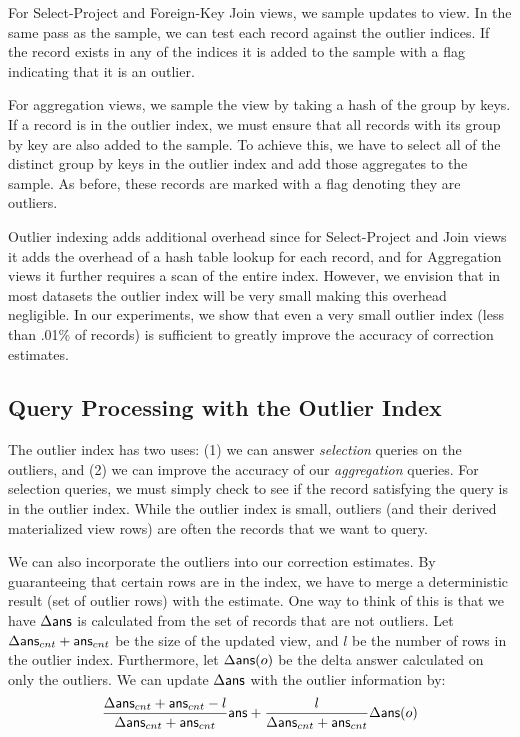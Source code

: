 
For Select-Project and Foreign-Key Join views, we sample updates to view.
In the same pass as the sample, we can test each record against the outlier indices. 
If the record exists in any of the indices it is added to the sample with a flag indicating that it is an outlier.

For aggregation views, we sample the view by taking a hash of the group by keys.
If a record is in the outlier index, we must ensure that all records with its group by key are also added to the sample.
To achieve this, we have to select all of the distinct group by keys in the outlier index and add those aggregates to the sample.
As before, these records are marked with a flag denoting they are outliers.

Outlier indexing adds additional overhead since for Select-Project and Join views it adds the overhead of a hash table lookup for each record, and for Aggregation views it further requires a scan of the entire index. 
However, we envision that in most datasets the outlier index will be very small making this overhead negligible.
In our experiments, we show that even a very small outlier index (less than .01\% of records) is sufficient to greatly improve the accuracy of
correction estimates.

\subsection{Query Processing with the Outlier Index} 
The outlier index has two uses: (1) we can answer \emph{selection} queries on the outliers, 
and (2) we can improve the accuracy of our \emph{aggregation} queries.
For selection queries, we must simply check to see if the record satisfying the query is in the outlier index.
While the outlier index is small, outliers (and their derived materialized view rows) are often the records that
we want to query.

We can also incorporate the outliers into our correction estimates. 
By guaranteeing that certain rows are in the index, we
have to merge a deterministic result (set of outlier rows) with the
estimate. One way to think of this is that we have $\Delta\textsf{ans}$ is
calculated from the set of records that are not outliers. Let $\Delta\textsf{ans}_{cnt} + \textsf{ans}_{cnt}$
be the size of the updated view, and $l$ be the number of rows in the
outlier index. Furthermore, let $\Delta\textsf{ans}(o)$ be the delta answer calculated on only the outliers.
We can update $\Delta\textsf{ans}$ with the outlier information by:
\[
\frac{\Delta\textsf{ans}_{cnt} + \textsf{ans}_{cnt}-l}{\Delta\textsf{ans}_{cnt} + \textsf{ans}_{cnt}}\textsf{ans}+\frac{l}{\Delta\textsf{ans}_{cnt} + \textsf{ans}_{cnt}}\Delta\textsf{ans}(o)
\]